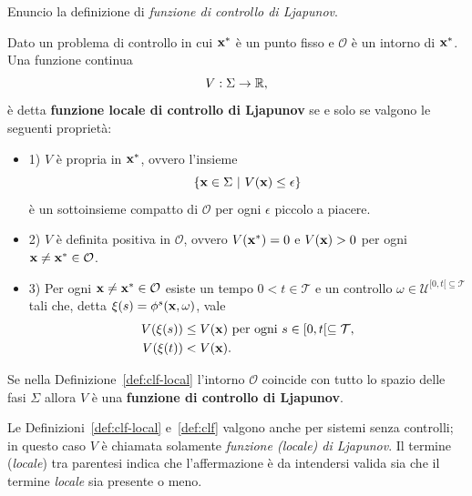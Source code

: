 Enuncio la definizione di \emph{funzione di controllo di Ljapunov}.
\begin{definition}
    \label{def:clf-local}
    Dato un problema di controllo in cui $\mathbf{x}^*$ è un punto fisso e
    $\mathcal O$ è un intorno di $\mathbf{x}^*$.
    Una funzione continua
    \begin{equation*}
        V : \Sigma \to \mathbb{R},
    \end{equation*}
    è detta \textbf{funzione locale di controllo di Ljapunov} se
    e solo se valgono le seguenti proprietà:
    \begin{itemize}
        \item 1) $V$ è propria in $\mathbf{x}^*$, ovvero l'insieme
        \begin{equation*}
            \left\{\mathbf{x} \in \Sigma\ |\ V(\mathbf{x}) \leq \epsilon \right\}
        \end{equation*}
        è un sottoinsieme compatto di $\mathcal O$ per ogni $\epsilon$ piccolo a piacere.
        \item 2) $V$ è definita positiva in $\mathcal O$, ovvero $V(\mathbf{x}^*) = 0$ e
        $V(\mathbf{x}) > 0$ per ogni $\mathbf{x} \neq \mathbf{x}^* \in \mathcal O$.
        \item 3) Per ogni $\mathbf{x} \neq \mathbf{x}^* \in \mathcal O$
        esiste un tempo $0 < t \in \mathcal T$ e un controllo $\omega \in \mathcal U^{[0,t[ \subseteq \mathcal T}$
        tali che, detta $\xi(s) = \phi^s(\mathbf{x}, \omega)$, vale
        \begin{align*}
            V(\xi(s)) &\leq V(\mathbf{x}) \text{ per ogni } s \in [0,t[ \subseteq \mathcal T, \\
            V(\xi(t)) &< V(\mathbf{x}).
        \end{align*}
    \end{itemize}
\end{definition}

\begin{definition}
    Se nella Definizione~\ref{def:clf-local} l'intorno $\mathcal O$ coincide
    con tutto lo spazio delle fasi $\Sigma$ allora $V$ è una
    \textbf{funzione di controllo di Ljapunov}.
    \label{def:clf}
\end{definition}

Le Definizioni~\ref{def:clf-local} e~\ref{def:clf} valgono anche per sistemi
senza controlli; in questo caso $V$ è chiamata solamente \emph{funzione (locale) di Ljapunov}.
Il termine (\emph{locale}) tra parentesi indica che l'affermazione è da intendersi valida
sia che il termine \emph{locale} sia presente o meno.

